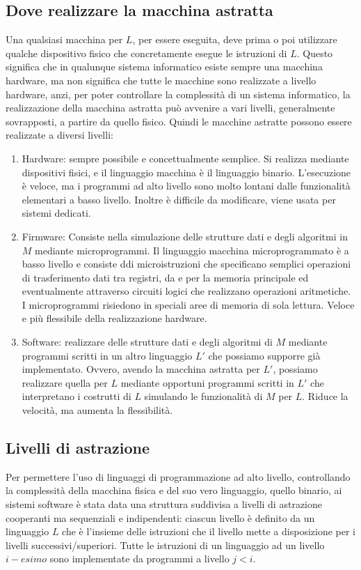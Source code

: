 \documentclass[oneside,a4paper,11pt]{book}
\theoremstyle{italicstyle}
\theoremstyle{normStyle}
\begin{document}
\subsection{Dove realizzare la macchina astratta}
Una qualsiasi macchina per $L$, per essere eseguita, deve prima o poi 
utilizzare qualche dispositivo fisico che concretamente esegue le istruzioni 
di $L$. Questo significa che in qualunque sistema informatico esiste 
sempre una macchina hardware, ma non significa che tutte le macchine 
sono realizzate a livello hardware,  anzi, per poter controllare 
la complessità di un sistema informatico, la realizzazione della macchina 
astratta può avvenire a vari livelli, generalmente sovrapposti, a partire  
da quello fisico. Quindi le macchine astratte possono essere realizzate 
a diversi livelli:
\begin{enumerate}
  \item Hardware: sempre possibile e concettualmente semplice. Si 
  realizza mediante dispositivi fisici, e il linguaggio macchina è il 
  linguaggio binario. L'esecuzione è veloce, ma i programmi ad alto 
  livello sono molto lontani dalle funzionalità elementari a basso livello.
  Inoltre è difficile da modificare, viene usata per sistemi dedicati.
  \item Firmware: Consiste nella simulazione delle strutture dati e degli algoritmi 
  in $M$ mediante microprogrammi. Il linguaggio macchina microprogrammato 
  è a basso livello e consiste ddi microistruzioni che specificano 
  semplici operazioni di trasferimento dati tra registri, da e per la 
  memoria principale ed eventualmente attraverso circuiti logici che 
  realizzano operazioni aritmetiche. I microprogrammi risiedono in speciali 
  aree di memoria di sola lettura. Veloce e più flessibile della realizzazione 
  hardware.
  \item Software: realizzare delle strutture dati e degli algoritmi di $M$ 
  mediante programmi scritti in un altro linguaggio $L'$ che possiamo supporre già 
  implementato. Ovvero, avendo la macchina astratta per $L'$, possiamo realizzare quella per $L$
  mediante opportuni programmi scritti in $L'$ che interpretano i costrutti di $L$ 
  simulando le funzionalità di $M$ per $L$. Riduce la velocità, ma 
  aumenta la flessibilità.
\end{enumerate}
\subsection{Livelli di astrazione}
Per permettere l'uso di linguaggi di programmazione ad alto livello,
controllando la complessità della macchina fisica e del suo vero linguaggio,
quello binario, ai sistemi software è stata data una struttura suddivisa 
a livelli di astrazione cooperanti ma sequenziali e indipendenti:
ciascun livello è definito da un linguaggio $L$ che è l'insieme delle istruzioni 
che il livello mette a disposizione per i livelli successivi/superiori.
Tutte le istruzioni di un linguaggio ad un livello $i-esimo$ sono 
implementate da programmi a livello $j<i$.
\end{document}
